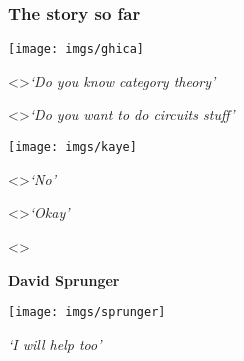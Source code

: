 \begin{frame}
    \frametitle{The story so far}

    \centering

    \begin{minipage}{0.45\textwidth}
        \centering


        \vspace{0.5em}

        \texttt{[image: imgs/ghica]}

        \visible<\iftoggle{static}{1}{2-}>{\emph{`Do you know category theory'}}

        \visible<\iftoggle{static}{1}{4-}>{\emph{`Do you want to do circuits stuff'}}
    \end{minipage}
    \begin{minipage}{0.25\textwidth}
        \centering


        \vspace{0.5em}

        \texttt{[image: imgs/kaye]}%

        \visible<\iftoggle{static}{1}{3-}>{\emph{`No'}}

        \visible<\iftoggle{static}{1}{5-}>{\emph{`Okay'}}
    \end{minipage}
    \visible<\iftoggle{static}{1}{6-}>{%
        \begin{minipage}{0.25\textwidth}
            \centering

            \textbf{David Sprunger}

            \vspace{0.5em}

            \texttt{[image: imgs/sprunger]}

            \phantom{hello}

            \emph{`I will help too'}
        \end{minipage}%
    }
\end{frame}